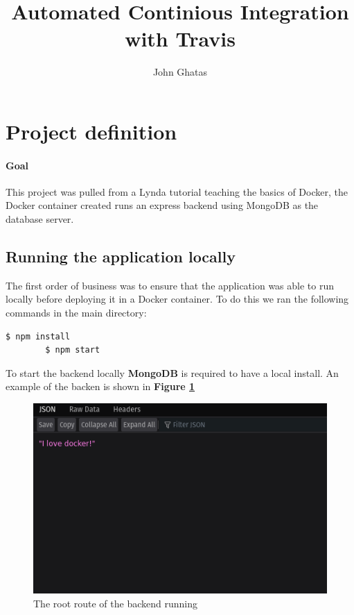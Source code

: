 \documentclass{paper}
\title{Automated Continious Integration with Travis}
\date{\displaydate{date}}
\author{John Ghatas}
\begin{document}
    \maketitle
    \newpage
    
    \tableofcontents
    \newpage

    \section{Project definition}
    \paragraph{Goal}{This project was pulled from a Lynda tutorial teaching the basics of Docker, 
    the Docker container created runs an express backend using MongoDB as the database server.}

    \subsection{Running the application locally}{The first order of business was to ensure that the application
    was able to run locally before deploying it in a Docker container. To do this we ran the following commands in
    the main directory:
    \begin{lstlisting}[language=bash]
        $ npm install
        $ npm start
    \end{lstlisting}
    To start the backend locally \textbf{MongoDB} is required to have a local install. An example of the backen is shown
    in \textbf{Figure \ref{fig:backend}}
    \begin{figure}[!h]
        \centering
        \includegraphics[scale=2.6, pagebox=artbox]{Images/server.png}
        \caption{The root route of the backend running}
        \label{fig:backend}
    \end{figure}
    \newpage
    }
\end{document}
